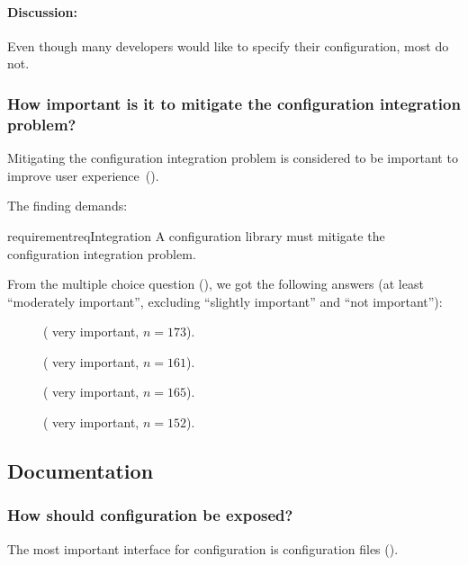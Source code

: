 \paragraph{Discussion:}
Even though many developers would like to specify their configuration, most do not.


\subsubsection{How important is it to mitigate the configuration integration problem?}

\begin{finding}
Mitigating the configuration integration problem is considered to be important to improve user experience~().
\end{finding}

The finding demands:

\begin{restatable}{requirement}{reqIntegration}
A configuration library must mitigate the configuration integration problem.%
\label{req:integration}
\end{restatable}

\methodQuestion{}
From the multiple choice question (), we got the following answers (at least ``moderately important'', excluding ``slightly important'' and ``not important''):
\begin{description}
\item[]  ( very important, $n=173$).
\item[]  ( very important, $n=161$).
\item[]  ( very important, $n=165$).
\item[]  ( very important, $n=152$).
\end{description}


\subsection{Documentation}

\subsubsection{How should configuration be exposed?}
\begin{finding}
The most important interface for configuration is configuration files ().
\end{finding}


